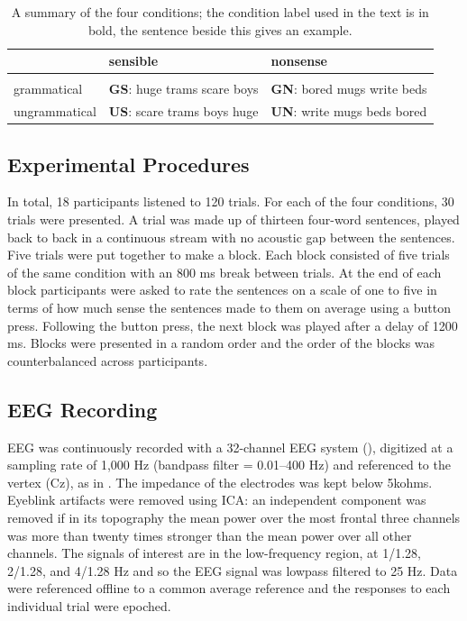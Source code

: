 \documentclass[a4paper,10pt,twoside]{article}
\begin{document}
\begin{table}
\begin{tabular}{l|ll}
&sensible&nonsense\\
\hline\\
grammatical&\textbf{GS}: huge trams scare boys&\textbf{GN}: bored mugs write beds\\
ungrammatical &\textbf{US}: scare trams boys huge&\textbf{UN}: write mugs beds bored
\end{tabular}
\caption{A summary of the four conditions; the condition label used in the text is in
  bold, the sentence beside this gives an
  example.\label{tab:conditions}}
\end{table}

\subsection*{Experimental Procedures}

In total, 18 participants listened to 120 trials. For each of the four
conditions, 30 trials were presented. A trial was made up of thirteen
four-word sentences, played back to back in a continuous stream with
no acoustic gap between the sentences. Five trials were put together
to make a block. Each block consisted of five trials of the same
condition with an 800 ms break between trials. At the end of each
block participants were asked to rate the sentences on a scale of one
to five in terms of how much sense the sentences made to them on
average using a button press. Following the button press, the next
block was played after a delay of 1200 ms. Blocks were presented in a
random order and the order of the blocks was counterbalanced across
participants.

\subsection*{EEG Recording}

EEG was continuously recorded with a 32-channel EEG system (),
digitized at a sampling rate of 1,000 Hz (bandpass filter = 0.01–400
Hz) and referenced to the vertex (Cz), as in \cite{DingEtAl2017}. The
impedance of the electrodes was kept below 5kohms. Eyeblink artifacts were removed using ICA: an independent component
was removed if in its topography the mean power over the most frontal
three channels was more than twenty times stronger than the mean power
over all other channels. The signals of interest are in the
low-frequency region, at 1/1.28, 2/1.28, and 4/1.28 Hz and so the EEG
signal was lowpass filtered to 25 Hz. Data were referenced offline to
a common average reference and the responses to each individual trial
were epoched. 
\end{document}
